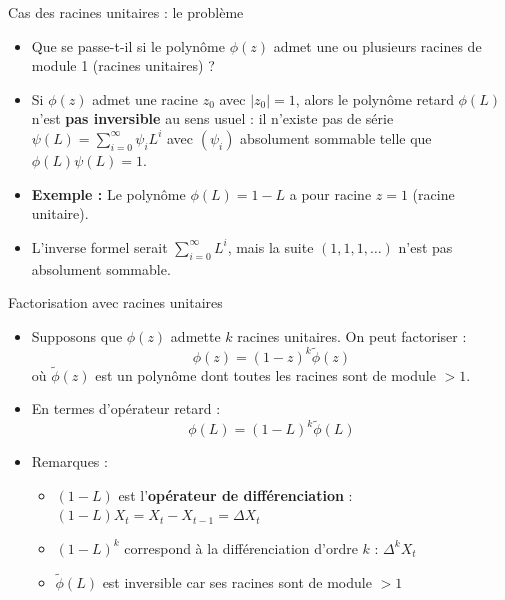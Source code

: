 \documentclass[11pt,aspectratio=169]{beamer}
\begin{document}
\begin{frame}{Cas des racines unitaires : le problème}

\begin{itemize}

\item Que se passe-t-il si le polynôme $\phi(z)$ admet une ou plusieurs racines de module 1 (racines unitaires) ?\newline

\item Si $\phi(z)$ admet une racine $z_0$ avec $|z_0| = 1$, alors le polynôme retard $\phi(L)$ n'est \textbf{pas inversible} au sens usuel : il n'existe pas de série $\psi(L) = \sum_{i=0}^{\infty} \psi_i L^i$ avec $(\psi_i)$ absolument sommable telle que $\phi(L) \psi(L) = 1$.\newline

\item \textbf{Exemple :} Le polynôme $\phi(L) = 1 - L$ a pour racine $z = 1$ (racine unitaire).\newline

\item L'inverse formel serait $\sum_{i=0}^{\infty} L^i$, mais la suite $(1, 1, 1, \ldots)$ n'est pas absolument sommable.

\end{itemize}

\end{frame}

\begin{frame}{Factorisation avec racines unitaires}

\begin{itemize}

\item Supposons que $\phi(z)$ admette $k$ racines unitaires. On peut factoriser :
  \[
  \phi(z) = (1-z)^k \tilde{\phi}(z)
  \]
  où $\tilde{\phi}(z)$ est un polynôme dont toutes les racines sont de module $> 1$.\newline

\item En termes d'opérateur retard :
  \[
  \phi(L) = (1-L)^k \tilde{\phi}(L)
  \]\newline

\item Remarques :
  \begin{itemize}
    \item $(1-L)$ est l'\textbf{opérateur de différenciation} : $(1-L)X_t = X_t - X_{t-1} = \Delta X_t$\newline
    \item $(1-L)^k$ correspond à la différenciation d'ordre $k$ : $\Delta^k X_t$\newline
    \item $\tilde{\phi}(L)$ est inversible car ses racines sont de module $> 1$
  \end{itemize}

\end{itemize}

\end{frame}
\end{document}
